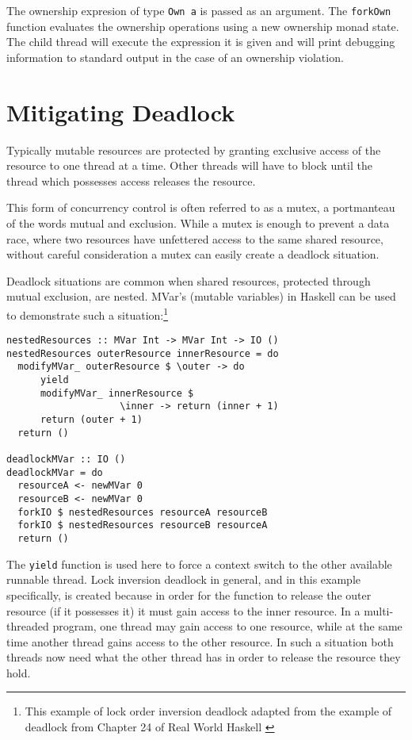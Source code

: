 \documentclass[onehalf,11pt]{beavtex}
\begin{document}
The ownership expresion of type \texttt{Own a} is passed as
an argument. The \texttt{forkOwn} function evaluates the ownership operations
using a new ownership monad state. The child thread will execute the
expression it is given and will print debugging information to standard output
in the case of an ownership violation.



\section{Mitigating Deadlock}

Typically mutable resources are protected by granting exclusive access
of the resource to one thread at a time.
Other threads will have to block until the thread which possesses access
releases the resource.

This form of concurrency control is often referred to as a mutex, a
portmanteau of the words mutual and exclusion.
While a mutex is enough to prevent a data race, where two resources have
unfettered access to the same shared resource, without careful consideration
a mutex can easily create a deadlock situation.

Deadlock situations are common when shared resources, protected through
mutual exclusion, are nested.  MVar's (mutable variables) in Haskell can be
used to demonstrate such a situation:\footnote{ This example of lock order
  inversion deadlock adapted from the example of deadlock from Chapter 24 of
  Real World Haskell \cite{O'Sullivan:2008:RWH:1523280} }

\begin{lstlisting}
nestedResources :: MVar Int -> MVar Int -> IO ()
nestedResources outerResource innerResource = do
  modifyMVar_ outerResource $ \outer -> do
      yield
      modifyMVar_ innerResource $
                    \inner -> return (inner + 1)
      return (outer + 1)
  return ()

deadlockMVar :: IO ()
deadlockMVar = do
  resourceA <- newMVar 0
  resourceB <- newMVar 0
  forkIO $ nestedResources resourceA resourceB
  forkIO $ nestedResources resourceB resourceA
  return ()
\end{lstlisting}

The \texttt{yield} function is used here to force a context switch to the other
available runnable thread.
Lock inversion deadlock in general, and in this example
specifically, is created because in order for the function to release the outer
resource (if it possesses it) it must gain access to the inner resource.
In a multi-threaded program, one thread may gain access to one resource,
while at the same time another thread gains access to the other resource.
In such a situation both threads now need what the other thread has in order to
release the resource they hold.
\end{document}

